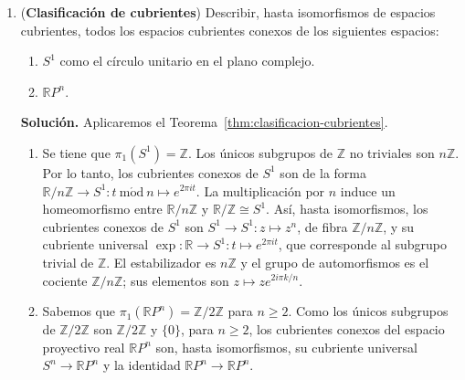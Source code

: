 \documentclass[11pt,a4paper]{article}
\theoremstyle{plain}
\theoremstyle{definition}
\theoremstyle{remark}
\newcommand{\RR}{\mathbb R}
\newcommand{\NN}{\mathbb N}
\newcommand{\ZZ}{\mathbb Z}
\begin{document}
\begin{enumerate}[label=\arabic*.,leftmargin=*]
Ahora bien, para todo $U$, existe $n\in\NN$ tal que $U$ contiene al punto
$(1,1,\dots,1,z_{n+1},z_{n+2},\dots)$ para $z_{n+1},z_{n+2},\dots\in S^1$.
Consideremos el siguiente lazo
\[
\phi:I\to U, \qquad t\mapsto(1,\dots,1,e^{2\pi it},1,1,\dots).
\]
Entonces $[\phi]\ne1$ en $\pi_1(B)$; en contradicción con la hipótesis
sobre $U$.

\item (\textbf{Clasificación de cubrientes}) Describir, hasta isomorfismos
de espacios cubrientes, todos los espacios cubrientes conexos de los
siguientes espacios:
\begin{enumerate}[label=\alph*)]
\item $S^1$ como el círculo unitario en el plano complejo.
\item $\RR P^n$.
\end{enumerate}

\noindent\textbf{Solución.} Aplicaremos el
Teorema~\ref{thm:clasificacion-cubrientes}.
\begin{enumerate}[label=\alph*)]
\item Se tiene que $\pi_1(S^1)=\ZZ$. Los únicos subgrupos de $\ZZ$ no
triviales son $n\ZZ$. Por lo tanto, los cubrientes conexos de $S^1$ son de
la forma $\RR/n\ZZ\to S^1:t\ \mathrm{m\acute od}\ n\mapsto e^{2\pi it}$. La
multiplicación por $n$ induce un homeomorfismo entre $\RR/n\ZZ$ y
$\RR/\ZZ\cong S^1$. Así, hasta isomorfismos, los cubrientes conexos de
$S^1$ son $S^1\to S^1:z\mapsto z^n$, de fibra $\ZZ/n\ZZ$, y su cubriente
universal $\exp:\RR\to S^1:t\mapsto e^{2\pi it}$, que corresponde al
subgrupo trivial de $\ZZ$. El estabilizador es $n\ZZ$ y el grupo de
automorfismos es el cociente $\ZZ/n\ZZ$; sus elementos son
$z\mapsto ze^{2i\pi k/n}$.
\item Sabemos que $\pi_1(\RR P^n)=\ZZ/2\ZZ$ para $n\ge2$. Como los únicos
subgrupos de $\ZZ/2\ZZ$ son $\ZZ/2\ZZ$ y $\{0\}$, para $n\ge2$, los
cubrientes conexos del espacio proyectivo real $\RR P^n$ son, hasta
isomorfismos, su cubriente universal $S^n\to\RR P^n$ y la identidad
$\RR P^n\to\RR P^n$.
\end{enumerate}


\end{enumerate}
\end{document}
